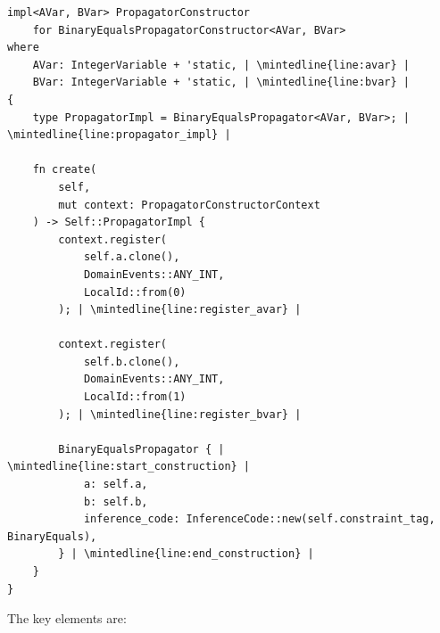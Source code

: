 \documentclass{article}
\begin{document}
\begin{listing}[H]
    \begin{verbatim}
impl<AVar, BVar> PropagatorConstructor 
    for BinaryEqualsPropagatorConstructor<AVar, BVar>
where
    AVar: IntegerVariable + 'static, | \mintedline{line:avar} |
    BVar: IntegerVariable + 'static, | \mintedline{line:bvar} |
{
    type PropagatorImpl = BinaryEqualsPropagator<AVar, BVar>; | \mintedline{line:propagator_impl} |

    fn create(
        self, 
        mut context: PropagatorConstructorContext
    ) -> Self::PropagatorImpl {
        context.register(
            self.a.clone(),
            DomainEvents::ANY_INT, 
            LocalId::from(0)
        ); | \mintedline{line:register_avar} |
        
        context.register(
            self.b.clone(), 
            DomainEvents::ANY_INT, 
            LocalId::from(1)
        ); | \mintedline{line:register_bvar} |

        BinaryEqualsPropagator { | \mintedline{line:start_construction} |
            a: self.a,
            b: self.b,
            inference_code: InferenceCode::new(self.constraint_tag, BinaryEquals),
        } | \mintedline{line:end_construction} |
    }
}
    \end{verbatim}
    \caption{Implementation of the \texttt{PropagatorConstructor} trait.}
    \label{lst:constructor_impl}
\end{listing}

The key elements are:
\end{document}
